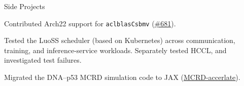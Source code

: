 \begin{rubric}{Side Projects}

%
  Contributed Arch22 support for \texttt{aclblasCsbmv} (\href{https://gitcode.com/cann/ops-blas/merge_requests/681}{\#681}).

%
  Tested the LuoSS scheduler (based on Kubernetes)  across communication, training, and inference-service workloads. Separately tested HCCL, and investigated test failures.

%
  Migrated the DNA--p53 MCRD simulation code to JAX (\href{https://github.com/kingsley-wade/MCRD-accerlate}{MCRD-accerlate}).

\end{rubric}
